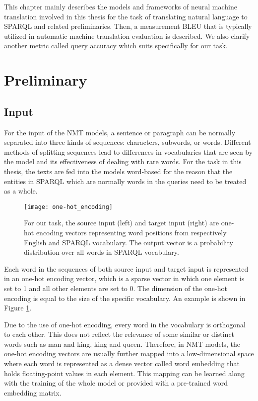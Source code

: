 
This chapter mainly describes the models and frameworks of neural machine translation involved in this thesis for the task of translating natural language to SPARQL and related preliminaries. Then, a measurement BLEU that is typically utilized in automatic machine translation evaluation is described. We also clarify another metric called query accuracy which suits specifically for our task.

\section{Preliminary}

\subsection{Input}

For the input of the NMT models, a sentence or paragraph can be normally separated into three kinds of sequences: characters, subwords, or words. Different methods of splitting sequences lead to differences in vocabularies that are seen by the model and its effectiveness of dealing with rare words. For the task in this thesis, the texts are fed into the models word-based for the reason that the entities in SPARQL which are normally words in the queries need to be treated as a whole.

\begin{figure}[h]
\texttt{[image: one-hot\_encoding]}
\centering
\caption{For our task, the source input (left) and target input (right) are one-hot encoding vectors representing word positions from respectively English and SPARQL vocabulary. The output vector is a probability distribution over all words in SPARQL vocabulary.}
\label{figure:one-hot encoding}
\end{figure}

Each word in the sequences of both source input and target input is represented in an one-hot encoding vector, which is a sparse vector in which one element is set to 1 and all other elements are set to 0. The dimension of the one-hot encoding is equal to the size of the specific vocabulary. An example is shown in Figure \ref{figure:one-hot encoding}.

Due to the use of one-hot encoding, every word in the vocabulary is orthogonal to each other. This does not reflect the relevance of some similar or distinct words such as man and king, king and queen. Therefore, in NMT models, the one-hot encoding vectors are usually further mapped into a low-dimensional space where each word is represented as a dense vector called word embedding that holds floating-point values in each element. This mapping can be learned along with the training of the whole model or provided with a pre-trained word embedding matrix.

